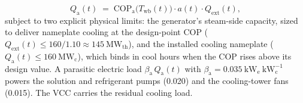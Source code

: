 \documentclass[a4paper,fleqn]{cas-sc}
\begin{document}
\begin{equation}
\label{eq:abs_yield}
Q_\mathrm{a}(t) \;=\; \mathrm{COP}_\mathrm{a}\!\big(T_\mathrm{wb}(t)\big)\cdot a(t)\cdot Q_\mathrm{ext}(t),
\end{equation}
subject to two explicit physical limits: the generator's steam-side capacity, sized to deliver nameplate cooling at the design-point COP ($Q_\mathrm{ext}(t) \le 160/1.10 \approx 145~\mathrm{MW}_\mathrm{th}$), and the installed cooling nameplate ($Q_\mathrm{a}(t) \le 160~\mathrm{MW}_\mathrm{c}$), which binds in cool hours when the COP rises above its design value. A parasitic electric load $\beta_\mathrm{a}\, Q_\mathrm{a}(t)$ with $\beta_\mathrm{a}=0.035~\mathrm{kW}_\mathrm{e}~\mathrm{kW}_\mathrm{c}^{-1}$ powers the solution and refrigerant pumps (0.020) and the cooling-tower fans (0.015). The VCC carries the residual cooling load.
\end{document}
